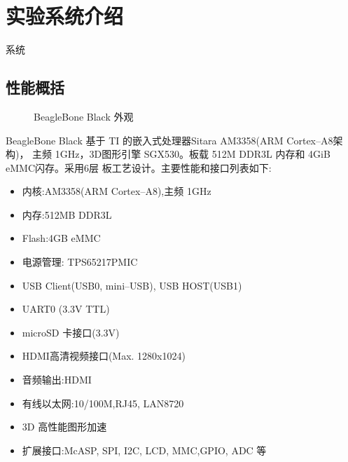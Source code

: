 \chapter{实验系统介绍}{系统}

\section{性能概括}

\begin{figure}
\centering
{}\hspace{1cm}
\caption{BeagleBone Black 外观}
\end{figure}

	BeagleBone Black 基于 TI 的嵌入式处理器Sitara AM3358(ARM Cortex--A8架构)，
主频 1GHz，3D图形引擎 SGX530。板载 512M DDR3L 内存和 4GiB eMMC闪存。采用6层
板工艺设计。主要性能和接口列表如下:
	
\begin{itemize}\itemsep=-3pt
  \item 内核:AM3358(ARM Cortex--A8),主频 1GHz
  \item 内存:512MB DDR3L
  \item Flash:4GB eMMC
  \item 电源管理: TPS65217PMIC
  \item USB Client(USB0, mini--USB), USB HOST(USB1)
  \item UART0 (3.3V TTL)
  \item microSD 卡接口(3.3V)
  \item HDMI高清视频接口(Max. 1280x1024)
  \item 音频输出:HDMI
  \item 有线以太网:10/100M,RJ45, LAN8720
  \item 3D 高性能图形加速
  \item 扩展接口:McASP, SPI, I2C, LCD, MMC,GPIO, ADC 等
\end{itemize}

